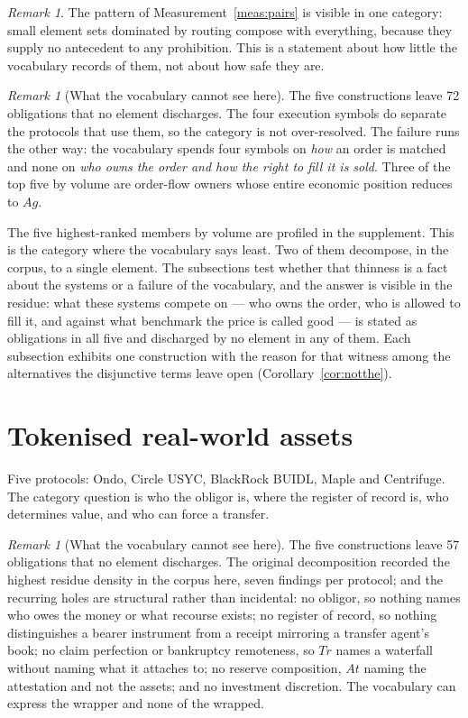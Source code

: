 \documentclass[11pt,reqno]{amsart}
\theoremstyle{plain}
\theoremstyle{definition}
\theoremstyle{remark}
\newtheorem{remark}[theorem]{Remark}
\begin{document}
\begin{remark}
The pattern of Measurement~\ref{meas:pairs} is visible in one category:
small element sets dominated by routing compose with everything, because they
supply no antecedent to any prohibition. This is a statement about how little
the vocabulary records of them, not about how safe they are.
\end{remark}

\begin{remark}[What the vocabulary cannot see here]
The five constructions leave 72 obligations that no element discharges. The four execution symbols do separate the protocols
that use them, so the category is not over-resolved. The failure runs the other
way: the vocabulary spends four symbols on \emph{how} an order is matched and
none on \emph{who owns the order and how the right to fill it is sold}. Three of
the top five by volume are order-flow owners whose entire economic position
reduces to $Ag$.
\end{remark}

The five highest-ranked members by volume are profiled in the supplement.
This is the category where the vocabulary says least. Two of them decompose, in the corpus,
to a single element. The subsections test whether that thinness is a fact about
the systems or a failure of the vocabulary, and the answer is visible in the
residue: what these systems compete on --- who owns the order, who is allowed to
fill it, and against what benchmark the price is called good --- is stated as
obligations in all five and discharged by no element in any of them. Each
subsection exhibits one construction with the reason for that witness among the
alternatives the disjunctive terms leave open (Corollary~\ref{cor:notthe}).

\section{Tokenised real-world assets}\label{sec:cat:rwa}

Five protocols: Ondo, Circle USYC, BlackRock BUIDL, Maple and Centrifuge. The
category question is who the obligor is, where the register of record is, who
determines value, and who can force a transfer.

\begin{remark}[What the vocabulary cannot see here]
The five constructions leave 57 obligations that no element discharges. The original decomposition recorded the
highest residue density in the corpus here, seven findings per protocol; and the recurring holes are structural rather than incidental: no
obligor, so nothing names who owes the money or what recourse exists; no
register of record, so nothing distinguishes a bearer instrument from a receipt
mirroring a transfer agent's book; no claim perfection or bankruptcy remoteness,
so $Tr$ names a waterfall without naming what it attaches to; no reserve
composition, $At$ naming the attestation and not the assets; and no investment
discretion. The vocabulary can express the wrapper and none of the wrapped.
\end{remark}
\end{document}
